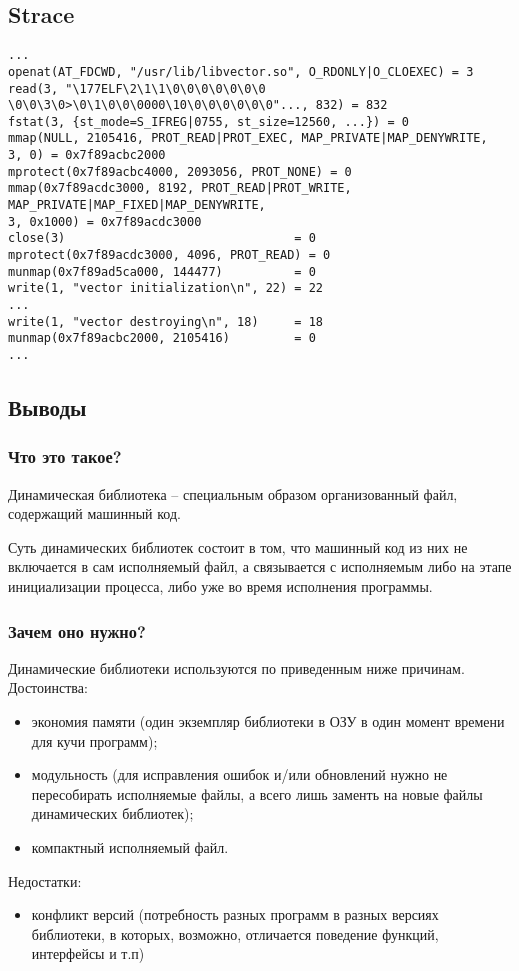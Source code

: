 \documentclass[12pt]{article}
\begin{document}
\subsection*{Strace}
\begin{verbatim}
...
openat(AT_FDCWD, "/usr/lib/libvector.so", O_RDONLY|O_CLOEXEC) = 3
read(3, "\177ELF\2\1\1\0\0\0\0\0\0\0
\0\0\3\0>\0\1\0\0\0000\10\0\0\0\0\0\0"..., 832) = 832
fstat(3, {st_mode=S_IFREG|0755, st_size=12560, ...}) = 0
mmap(NULL, 2105416, PROT_READ|PROT_EXEC, MAP_PRIVATE|MAP_DENYWRITE,
3, 0) = 0x7f89acbc2000
mprotect(0x7f89acbc4000, 2093056, PROT_NONE) = 0
mmap(0x7f89acdc3000, 8192, PROT_READ|PROT_WRITE,
MAP_PRIVATE|MAP_FIXED|MAP_DENYWRITE,
3, 0x1000) = 0x7f89acdc3000
close(3)                                = 0
mprotect(0x7f89acdc3000, 4096, PROT_READ) = 0
munmap(0x7f89ad5ca000, 144477)          = 0
write(1, "vector initialization\n", 22) = 22
...
write(1, "vector destroying\n", 18)     = 18
munmap(0x7f89acbc2000, 2105416)         = 0
...
\end{verbatim}
\subsection*{Выводы}
\subsubsection*{Что это такое?}
    Динамическая библиотека -- специальным образом организованный файл, содержащий машинный код.
    
    Суть динамических библиотек состоит в том, что машинный код из них не включается в сам исполняемый файл, а связывается с исполняемым либо на этапе инициализации процесса, либо уже во время исполнения программы. 

\subsubsection*{Зачем оно нужно?} 
Динамические библиотеки используются по приведенным ниже причинам.
        Достоинства:
        \begin{itemize}
            \item экономия памяти (один экземпляр библиотеки в ОЗУ в один момент времени для кучи программ);
            \item  модульность (для исправления ошибок и/или обновлений нужно не пересобирать исполняемые файлы, а всего лишь заменть на новые файлы динамических библиотек);
            \item компактный исполняемый файл.
        \end{itemize}
        Недостатки:
        \begin{itemize}
            \item конфликт версий (потребность разных программ в разных версиях библиотеки, в которых, возможно, отличается поведение функций, интерфейсы и т.п)
        \end{itemize}
        
\end{document}
